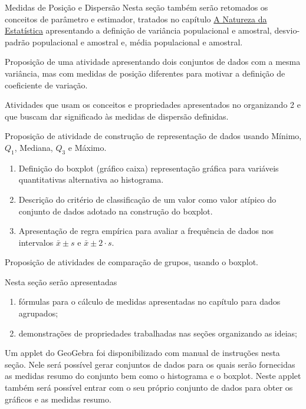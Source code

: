 \begin{apresentacao}{Medidas de Posição e Dispersão}
Nesta seção também serão retomados os conceitos de parâmetro e estimador, tratados no capítulo \hyperref[est1-chap]{A Natureza da Estatística} apresentando a definição de variância populacional e amostral, desvio-padrão populacional e amostral e, média populacional e amostral.

Proposição de uma atividade apresentando dois conjuntos de dados com a mesma variância, mas com medidas de posição diferentes para motivar a definição de coeficiente de variação.

Atividades que usam os conceitos e propriedades apresentados no organizando 2 e que buscam dar significado às medidas de dispersão definidas.

Proposição de atividade de construção de representação de dados usando Mínimo, $Q_1$, Mediana, $Q_3$ e Máximo.

\begin{enumerate}
\item Definição do boxplot (gráfico caixa) representação gráfica para variáveis quantitativas alternativa ao histograma.
\item Descrição do critério de classificação de um valor como valor atípico do conjunto de dados adotado na construção do boxplot.
\item Apresentação de regra empírica para avaliar a frequência de dados nos intervalos $\bar{x}\pm s$ e $\bar{x}\pm2\cdot s$.
\end{enumerate}

Proposição de atividades de comparação de grupos, usando o boxplot.


Nesta seção serão apresentadas

\begin{enumerate}
\item fórmulas para o cálculo de medidas apresentadas no capítulo para dados agrupados;
\item demonstrações de propriedades trabalhadas nas seções organizando as ideias;
\end{enumerate}


Um applet do GeoGebra foi disponibilizado com manual de instruções nesta seção. Nele será possível gerar conjuntos de dados para os quais serão fornecidas as medidas resumo do conjunto bem como o histograma e o boxplot. Neste applet também será possível entrar com o seu próprio conjunto de dados para obter os gráficos e as medidas resumo.


\end{apresentacao}
